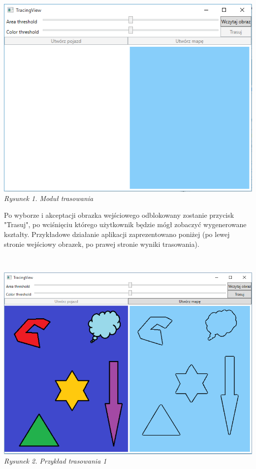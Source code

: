 \documentclass{article}
\begin{document}
~\\\begin{center}
	\includegraphics[scale=0.7]{tracingview}\\
	\textit{Rysunek 1. Moduł trasowania}
\end{center}
\newpage
Po wyborze i akceptacji obrazka wejściowego odblokowany zostanie przycisk "Trasuj", po wciśnięciu którego użytkownik będzie mógł zobaczyć wygenerowane kształty. Przykładowe działanie aplikacji zaprezentowano poniżej (po lewej stronie wejściowy obrazek, po prawej stronie wyniki trasowania).

~\\\begin{center}
	\includegraphics[scale=0.54]{tracingview2}\\
	\textit{Rysunek 2. Przykład trasowania 1}
\end{center}
\end{document}
